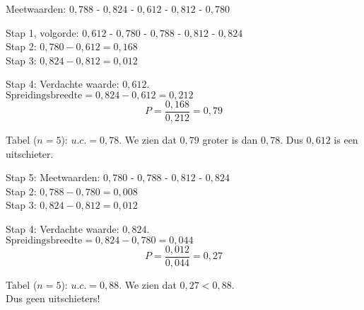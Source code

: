 \begin{antwoord}{1}
 Meetwaarden: $0,788$ - $0,824$ - $0,612$ - $0,812$ - $0,780$
 
 Stap 1, volgorde: $0,612$ - $0,780$ - $0,788$ - $0,812$ - $0,824$  \\
 Stap 2: $0,780 - 0,612 = 0,168$\\
 Stap 3: $0,824 - 0,812 = 0,012$  
 
 Stap 4:
 Verdachte waarde: $0,612$.\\
 $\text{Spreidingsbreedte} = 0,824 - 0,612 = 0,212$\\
 \[
 P = \frac{0,168}{0,212} = 0,79
 \]
 
 Tabel ($n = 5$): $u.c. = 0,78$. We zien dat $0,79$ groter is dan $0,78$.
 Dus $0,612$ is een uitschieter.

 \bigskip
 Stap 5: Meetwaarden: 
 $0,780$ - $0,788$ - $0,812$ - $0,824$\\
 
 Stap 2: $0,788 - 0,780 = 0,008$\\
 Stap 3: $0,824 - 0,812 = 0,012$  
 
 Stap 4:
 Verdachte waarde: $0,824$.\\
 $\text{Spreidingsbreedte} = 0,824 - 0,780 = 0,044$\\
 \[
 P = \frac{0,012}{0,044} = 0,27
 \]
 
 Tabel ($n = 5$): $u.c. = 0,88$. We zien dat $0,27 < 0,88$.\\
 Dus geen uitschieters!
 
 
 \end{antwoord} 
